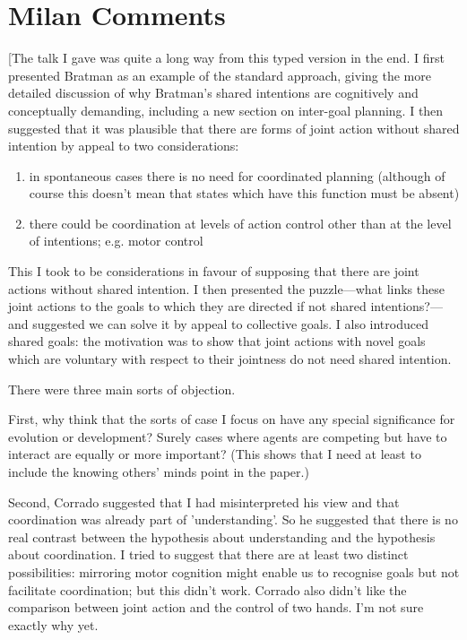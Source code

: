 \documentclass[14pt,a4paper]{extarticle}
\begin{document}
\setlength\footnotesep{1em}


\maketitle

\section{Milan Comments}

[The talk I gave was quite a long way from this typed version in the end.
I first presented Bratman as an example of the standard approach, giving the more detailed discussion of why Bratman's shared intentions are cognitively and conceptually demanding, including a new section on inter-goal planning.
I then suggested that it was plausible that there are forms of joint action without shared intention by appeal to two considerations:
\begin{enumerate}
\item in spontaneous cases there is no need for coordinated planning (although of course this doesn't mean that states which have this function must be absent)
\item there could be coordination at levels of action control other than at the level of intentions; e.g. motor control
\end{enumerate}
This I took to be considerations in favour of supposing that there are joint actions without shared intention.
I then presented the puzzle---what links these joint actions to the goals to which they  are directed if not shared intentions?---and suggested we can solve it by appeal to collective goals.  
I also introduced shared goals: the motivation was to show that joint actions with novel goals which are voluntary with respect to their jointness do not need shared intention.

There were three main sorts of objection.

First, why think that the sorts of case I focus on have any special significance for evolution or development?  Surely cases where agents are competing but have to interact are equally or more important?  (This shows that I need at least to include the knowing others' minds point in the paper.)

Second, Corrado suggested that I had misinterpreted his view and that coordination was already part of 'understanding'.  
So he suggested that there is no real contrast between the hypothesis about understanding and the hypothesis about coordination.  
I tried to suggest that there are at least two distinct possibilities: mirroring motor cognition might enable us to recognise goals but not facilitate coordination; but this didn't work.
Corrado also didn't like the comparison between joint action and the control of two hands.  I'm not sure exactly why yet.
\end{document}
